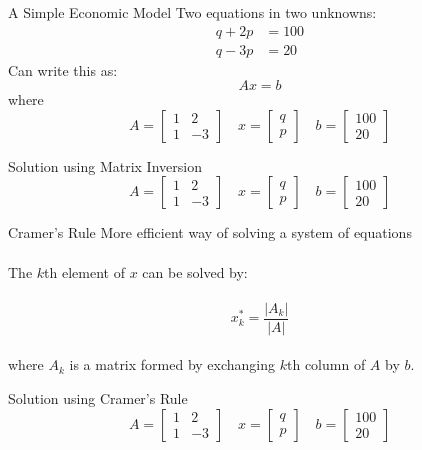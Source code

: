\documentclass{./../../Latex/teaching_slides}
\begin{document}
 \begin{frame}{A Simple Economic Model}
Two equations in two unknowns:
\begin{align*}
q + 2p &= 100 \\ q-3p &= 20
\end{align*}
Can write this as:
$$ Ax = b $$
where
$$A = \begin{bmatrix}
1 & 2 \\
1 & -3 
\end{bmatrix} \quad 
x = \begin{bmatrix}
q \\
p 
\end{bmatrix} \quad 
b = \begin{bmatrix}
100 \\
20 
\end{bmatrix}$$
\end{frame}

 \begin{frame}{Solution using Matrix Inversion}
$$A = \begin{bmatrix}
1 & 2 \\
1 & -3 
\end{bmatrix} \quad 
x = \begin{bmatrix}
q \\
p 
\end{bmatrix} \quad 
b = \begin{bmatrix}
100 \\
20 
\end{bmatrix}$$
\end{frame}

 \begin{frame}{Cramer's Rule}
More efficient way of solving a system of equations \\~\\
The $k$th element of $x$ can be solved by: \\~\\
$$ x^*_k = \frac{|A_k|}{|A|} $$ \\
where $A_k$ is a matrix formed by exchanging $k$th column of $A$ by $b$.
\end{frame}

 \begin{frame}{Solution using Cramer's Rule}
$$A = \begin{bmatrix}
1 & 2 \\
1 & -3 
\end{bmatrix} \quad 
x = \begin{bmatrix}
q \\
p 
\end{bmatrix} \quad 
b = \begin{bmatrix}
100 \\
20 
\end{bmatrix}$$
\end{frame}
\end{document}

